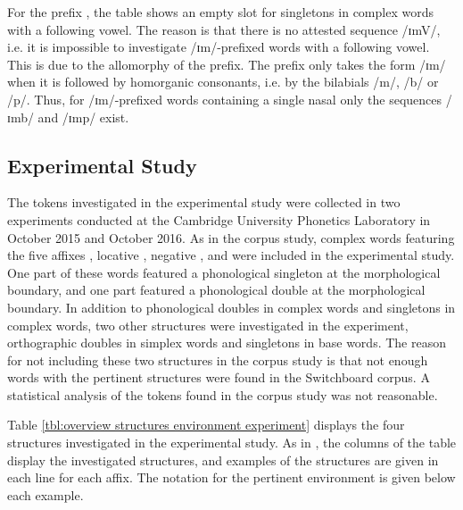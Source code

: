 For the prefix , the table shows an empty slot for singletons in complex words with a following vowel. The reason is that there is no attested sequence /ɪmV/, i.e. it is impossible to investigate /ɪm/-prefixed words with a following vowel. This is due to the allomorphy of the prefix. The prefix  only takes the form /ɪm/ when it is followed by homorganic consonants, i.e. by the bilabials /m/, /b/ or /p/. Thus, for /ɪm/-prefixed words containing a single nasal only the sequences /ɪmb/ and /ɪmp/ exist. 



\subsection{Experimental Study}\label{experiment data composition}

The tokens investigated in the experimental study were collected in two experiments conducted at the Cambridge University Phonetics Laboratory in October 2015 and October 2016. 
 As in the corpus study, complex words featuring the five affixes , locative , negative ,  and  were included  in the experimental study. One part of these words featured a phonological singleton at the morphological boundary, and one part  featured a phonological double at the morphological boundary. In addition to phonological doubles in complex words and singletons in complex words, two other structures were investigated in the experiment, orthographic doubles in simplex words and singletons in base words. The reason for not including these two structures in the corpus study is that not enough words with the pertinent structures were found in the Switchboard corpus. A statistical analysis of the tokens found in the corpus study was not reasonable.
 
 Table \ref{tbl:overview structures environment experiment} displays the four structures investigated in the experimental study. As in , the columns of the table display the investigated structures, and examples of the structures are given in each line for each affix. The notation for the pertinent environment is given below each example. 
 
 

